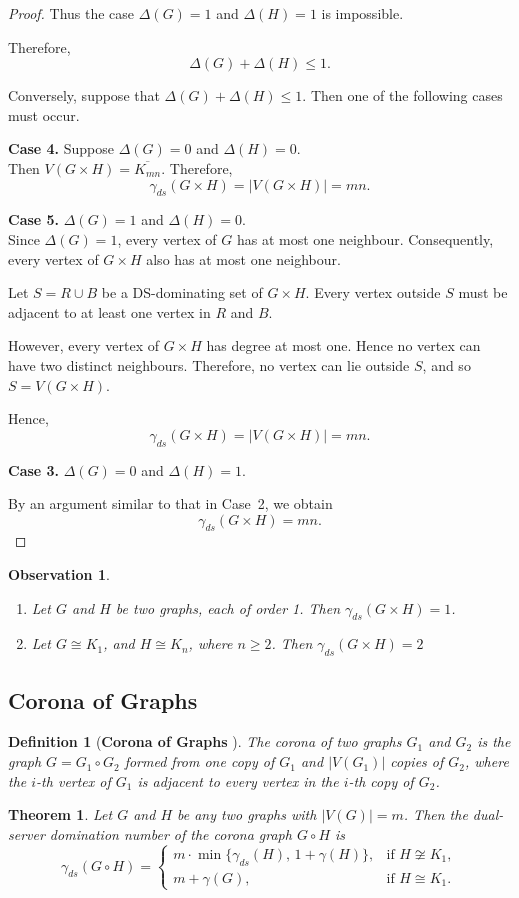 \documentclass{article}
\newtheorem{theorem}{Theorem}[section]
\newtheorem{observation}{Observation}[section]
\newtheorem{definition}{Definition}[section]
\begin{document}
\begin{proof}
Thus the case $\Delta(G)=1$ and $\Delta(H)=1$ is impossible.

Therefore,
\[
\Delta(G)+\Delta(H)\le1.
\]

Conversely, suppose that 
$\Delta(G)+\Delta(H)\le1$.
Then one of the following cases must occur.

\textbf{Case 4.}  Suppose $\Delta(G)=0$ and $\Delta(H)=0$.\\
Then $V(G\times H)=\overline{K_{mn}} $. Therefore, \[
\gamma_{ds}(G\times H)=|V(G\times H)|=mn.
\]



\textbf{Case 5.} $\Delta(G)=1$ and $\Delta(H)=0$.\\
Since $\Delta(G)=1$, every vertex of $G$ has at most one neighbour.
Consequently, every vertex of $G\times H$ also has at most one neighbour.

Let $S=R\cup B$
be a DS-dominating set of $G\times H$. Every vertex outside $S$ must be adjacent to at
least one vertex in $R$ and $B$.

However, every vertex of $G\times H$ has degree at most one. Hence no
vertex can have two distinct neighbours. Therefore, no vertex can lie
outside $S$, and so $
S=V(G\times H)$.

Hence,
\[
\gamma_{ds}(G\times H)=|V(G\times H)|=mn.
\]

\textbf{Case 3.} $\Delta(G)=0$ and $\Delta(H)=1$.

By an argument similar to that in Case~2, we obtain
\[
\gamma_{ds}(G\times H)=mn.
\]
\end{proof}
\begin{observation} 
\leavevmode
\begin{enumerate}
\item{Let $G$ and $H$ be two graphs, each of order 1. Then $\gamma_{ds}(G\times H)= 1$.}
\item{Let  $G \cong K_1$, and $H \cong {K_n}$, where $n \geq 2$. Then $\gamma_{ds}(G\times H)= 2$}
\end{enumerate}
\end{observation}
\subsection{Corona of Graphs}
\begin{definition}[\textbf{Corona of Graphs} {\cite{Corona}}]
The corona of two graphs $G_1$ and $G_2$ is the graph $G = G_1 \circ G_2$
formed from one copy of $G_1$ and $|V(G_1)|$ copies of $G_2$, where the
$i$-th vertex of $G_1$ is adjacent to every vertex in the $i$-th copy of $G_2$.
\end{definition}
\begin{theorem}
Let $G$ and $H$ be any two graphs with $|V(G)|=m$. Then the dual-server domination number of the corona graph $G\circ H$ is
\[
\gamma_{ds}(G\circ H)=
\begin{cases}
m \cdot \min\{\gamma_{ds}(H),\,1+\gamma(H)\}, & \text{if } H\not\cong K_{1},\\[2mm]
m+\gamma(G), & \text{if } H\cong K_{1}.
\end{cases}
\]
\end{theorem}
\end{document}

